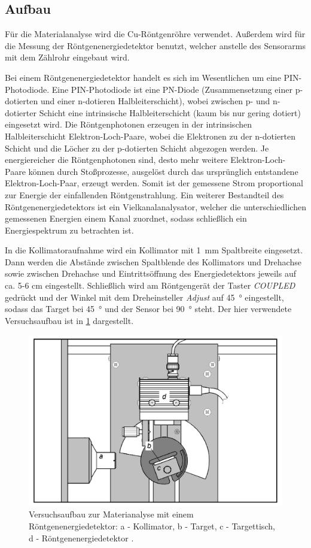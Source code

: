 \subsection{Aufbau}\label{subsec:material_aufbau}
Für die Materialanalyse wird die Cu-Röntgenröhre verwendet. Außerdem wird für die Messung der Röntgenenergiedetektor benutzt, welcher anstelle
des Sensorarms mit dem Zählrohr eingebaut wird.\par
Bei einem Röntgenenergiedetektor handelt es sich im Wesentlichen um eine PIN-Photodiode.
Eine PIN-Photodiode ist eine PN-Diode (Zusammensetzung einer p-dotierten und einer n-dotieren Halbleiterschicht), wobei zwischen
p- und n-dotierter Schicht eine intrinsische Halbleiterschicht (kaum bis nur gering dotiert) eingesetzt wird. Die Röntgenphotonen
erzeugen in der intrinsischen Halbleiterschicht Elektron-Loch-Paare, wobei die Elektronen zu der n-dotierten Schicht und die Löcher
zu der p-dotierten Schicht abgezogen werden. Je energiereicher die Röntgenphotonen sind, desto mehr weitere Elektron-Loch-Paare können durch
Stoßprozesse, ausgelöst durch das ursprünglich entstandene Elektron-Loch-Paar, erzeugt werden. Somit ist der gemessene Strom
proportional zur Energie der einfallenden Röntgenstrahlung. Ein weiterer Bestandteil des Röntgenenergiedetektors ist ein
Vielkanalanalysator, welcher die unterschiedlichen gemessenen Energien einem Kanal zuordnet, sodass schließlich ein Energiespektrum zu
betrachten ist.\par
In die Kollimatoraufnahme wird ein Kollimator mit \SI{1}{\milli \meter} Spaltbreite eingesetzt.
Dann werden die Abstände zwischen Spaltblende des Kollimators und Drehachse sowie zwischen Drehachse und Eintrittsöffnung des Energiedetektors jeweils
auf ca. 5-6 \unit{\cm} eingestellt. Schließlich wird am Röntgengerät der Taster \textit{COUPLED} gedrückt und der Winkel mit dem Dreheinsteller
\textit{Adjust} auf \SI{45}{\degree} eingestellt, sodass das Target bei \SI{45}{\degree} und der Sensor bei \SI{90}{\degree} steht.
Der hier verwendete Versuchsaufbau ist in \cref{fig:aufbau_material} dargestellt.
\begin{figure}[H]
	\centering
	\includegraphics[width=0.6\linewidth]{../figs/aufbau_material.png}
	\caption{Versuchsaufbau zur Materianalyse mit einem Röntgenenergiedetektor:
    a - Kollimator, b - Target, c - Targettisch, d - Röntgenenergiedetektor \cite{material_handblatt}.}
	\label{fig:aufbau_material}
\end{figure}
